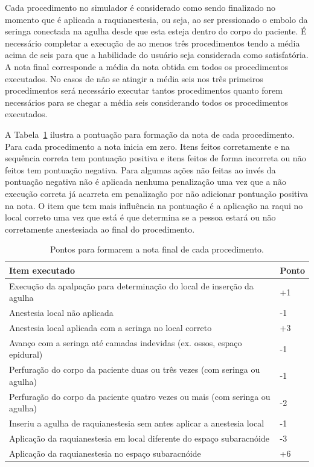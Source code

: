 Cada procedimento no simulador é considerado como sendo finalizado no momento que é aplicada a raquianestesia, ou seja, ao ser pressionado o embolo da seringa conectada na agulha desde que esta esteja dentro do corpo do paciente.
É necessário completar a execução de ao menos três procedimentos tendo a média acima de seis para que a habilidade do usuário seja considerada como satisfatória. A nota final corresponde a média da nota obtida em todos os procedimentos executados. No casos de não se atingir a média seis nos três primeiros procedimentos será necessário executar tantos procedimentos quanto forem necessários para se chegar a média seis considerando todos os procedimentos executados.   

A Tabela~\ref{tab:PontosNotaProcedimento} ilustra a pontuação para formação da nota de cada procedimento. Para cada procedimento a nota inicia em zero. Itens feitos corretamente e na sequência correta tem pontuação positiva e itens feitos de forma incorreta ou não feitos tem pontuação negativa. Para algumas ações não feitas ao invés da pontuação negativa não é aplicada nenhuma penalização uma vez que a não execução correta já acarreta em penalização por não adicionar pontuação positiva na nota. O item que tem mais influência na pontuação é a aplicação na raqui no local correto uma vez que está é que determina se a pessoa estará ou não corretamente anestesiada ao final do procedimento.

\begin{table}[!ht]
\begin{center}
\caption{Pontos para formarem a nota final de cada procedimento.}
\label{tab:PontosNotaProcedimento}
\begin{tabular}{|p{0.9\linewidth}|p{0.1\linewidth}|}
\hline
\textbf{Item executado} & \textbf{Ponto}\\
\hline\hline
Execução da apalpação para determinação do local de inserção da agulha & +1\\
Anestesia local não aplicada & -1\\
Anestesia local aplicada com a seringa no local correto & +3\\
Avanço com a seringa até camadas indevidas (ex. ossos, espaço epidural) & -1\\
Perfuração do corpo da paciente duas ou três vezes (com seringa ou agulha) & -1\\
Perfuração do corpo da paciente quatro vezes ou mais (com seringa ou agulha) & -2\\
Inseriu a agulha de raquianestesia sem antes aplicar a anestesia local & -1\\
Aplicação da raquianestesia em local diferente do espaço subaracnóide & -3\\
Aplicação da raquianestesia no espaço subaracnóide & +6\\
\hline
\end{tabular}
\end{center}
\end{table}

